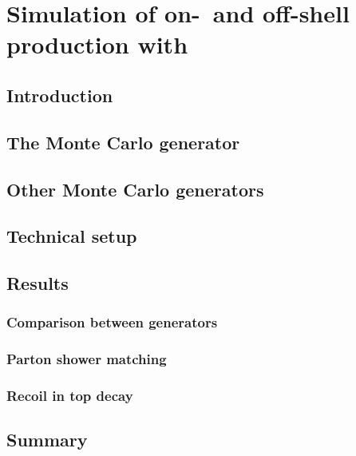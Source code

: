 \chapter{Simulation of on-~and off-shell \ttbar production with \bbfourl}
\label{ch:bb4l}

\section{Introduction}

\section{The Monte Carlo generator \bbfourl}

\section{Other \ttbar Monte Carlo generators}

\section{Technical setup}

\section{Results}

\subsection{Comparison between generators}

\subsection{Parton shower matching}

\subsection{Recoil in top decay}

\section{Summary}
